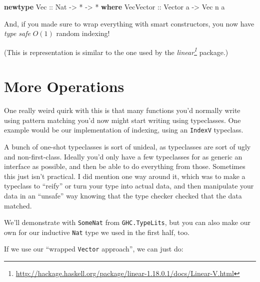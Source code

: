 \documentclass[]{article}
\newenvironment{Shaded}{}{}
\newcommand{\DataTypeTok}[1]{\textcolor[rgb]{0.56,0.13,0.00}{#1}}
\newcommand{\KeywordTok}[1]{\textcolor[rgb]{0.00,0.44,0.13}{\textbf{#1}}}
\newcommand{\NormalTok}[1]{#1}
\newcommand{\OperatorTok}[1]{\textcolor[rgb]{0.40,0.40,0.40}{#1}}
\newcommand{\OtherTok}[1]{\textcolor[rgb]{0.00,0.44,0.13}{#1}}
\renewcommand{\href}[2]{#2\footnote{\url{#1}}}
\begin{document}
\begin{Shaded}
\begin{Highlighting}[]
\KeywordTok{newtype} \DataTypeTok{Vec}\OtherTok{ ::} \DataTypeTok{Nat} \OtherTok{{-}\textgreater{}} \OperatorTok{*} \OtherTok{{-}\textgreater{}} \OperatorTok{*} \KeywordTok{where}
    \DataTypeTok{VecVector}\OtherTok{ ::} \DataTypeTok{Vector}\NormalTok{ a }\OtherTok{{-}\textgreater{}} \DataTypeTok{Vec}\NormalTok{ n a}
\end{Highlighting}
\end{Shaded}

And, if you made sure to wrap everything with smart constructors, you now have
\emph{type safe} \(O(1)\) random indexing!

(This is representation is similar to the one used by the
\emph{\href{http://hackage.haskell.org/package/linear-1.18.0.1/docs/Linear-V.html}{linear}}
package.)

\section{More Operations}\label{more-operations}

One really weird quirk with this is that many functions you'd normally write
using pattern matching you'd now might start writing using typeclasses. One
example would be our implementation of indexing, using an \texttt{IndexV}
typeclass.

A bunch of one-shot typeclasses is sort of unideal, as typeclasses are sort of
ugly and non-first-class. Ideally you'd only have a few typeclasses for as
generic an interface as possible, and then be able to do everything from those.
Sometimes this just isn't practical. I did mention one way around it, which was
to make a typeclass to ``reify'' or turn your type into actual data, and then
manipulate your data in an ``unsafe'' way knowing that the type checker checked
that the data matched.

We'll demonstrate with \texttt{SomeNat} from \texttt{GHC.TypeLits}, but you can
also make our own for our inductive \texttt{Nat} type we used in the first half,
too.

If we use our ``wrapped \texttt{Vector} approach'', we can just do:
\end{document}
